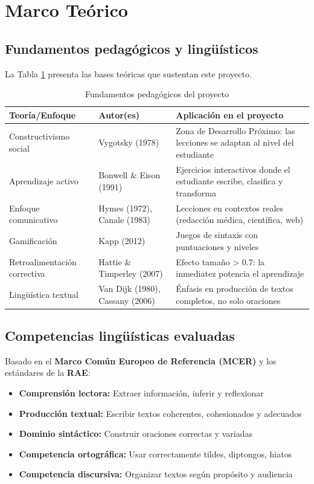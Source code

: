 \documentclass[12pt,spanish]{article}
\begin{document}
\newpage
\section{Marco Teórico}

\subsection{Fundamentos pedagógicos y lingüísticos}

La Tabla \ref{tab:teorias} presenta las bases teóricas que sustentan este proyecto.

\begin{table}[H]
\centering
\caption{Fundamentos pedagógicos del proyecto}
\label{tab:teorias}
\begin{tabular}{|p{3.5cm}|p{3.5cm}|p{6cm}|}
\hline
\textbf{Teoría/Enfoque} & \textbf{Autor(es)} & \textbf{Aplicación en el proyecto} \\
\hline
Constructivismo social & Vygotsky (1978) & Zona de Desarrollo Próximo: las lecciones se adaptan al nivel del estudiante \\
\hline
Aprendizaje activo & Bonwell \& Eison (1991) & Ejercicios interactivos donde el estudiante escribe, clasifica y transforma \\
\hline
Enfoque comunicativo & Hymes (1972), Canale (1983) & Lecciones en contextos reales (redacción médica, científica, web) \\
\hline
Gamificación & Kapp (2012) & Juegos de sintaxis con puntuaciones y niveles \\
\hline
Retroalimentación correctiva & Hattie \& Timperley (2007) & Efecto tamaño > 0.7: la inmediatez potencia el aprendizaje \\
\hline
Lingüística textual & Van Dijk (1980), Cassany (2006) & Énfasis en producción de textos completos, no solo oraciones \\
\hline
\end{tabular}
\end{table}

\subsection{Competencias lingüísticas evaluadas}

Basado en el \textbf{Marco Común Europeo de Referencia (MCER)} y los estándares de la \textbf{RAE}:

\begin{itemize}
    \item \textbf{Comprensión lectora:} Extraer información, inferir y reflexionar
    \item \textbf{Producción textual:} Escribir textos coherentes, cohesionados y adecuados
    \item \textbf{Dominio sintáctico:} Construir oraciones correctas y variadas
    \item \textbf{Competencia ortográfica:} Usar correctamente tildes, diptongos, hiatos
    \item \textbf{Competencia discursiva:} Organizar textos según propósito y audiencia
\end{itemize}
\end{document}
